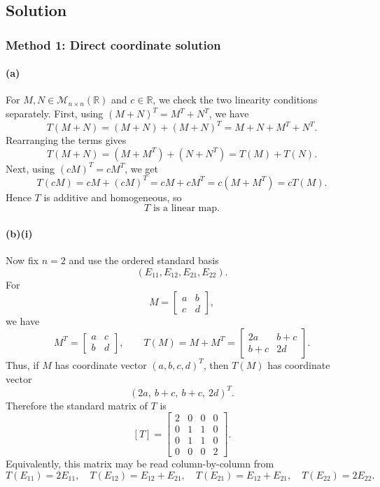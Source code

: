 \documentclass[12pt]{article}
\newcommand{\R}{\mathbb{R}}
\newcommand{\M}{\mathcal{M}}
\begin{document}
\subsection{Solution}


\subsubsection{Method 1: Direct coordinate solution}

\paragraph{(a)}
For $M,N\in \M_{n\times n}(\R)$ and $c\in\R$, we check the two linearity conditions separately.
First, using $(M+N)^T=M^T+N^T$, we have
\[
T(M+N)=(M+N)+(M+N)^T
=M+N+M^T+N^T.
\]
Rearranging the terms gives
\[
T(M+N)=(M+M^T)+(N+N^T)=T(M)+T(N).
\]
Next, using $(cM)^T=cM^T$, we get
\[
T(cM)=cM+(cM)^T=cM+cM^T=c(M+M^T)=cT(M).
\]
Hence $T$ is additive and homogeneous, so
\[
\boxed{T\text{ is a linear map}.}
\]

\paragraph{(b)(i)}
Now fix $n=2$ and use the ordered standard basis
\[
(E_{11},E_{12},E_{21},E_{22}).
\]
For
\[
M=\begin{bmatrix}a&b\\c&d\end{bmatrix},
\]
we have
\[
M^T=\begin{bmatrix}a&c\\b&d\end{bmatrix},
\qquad
T(M)=M+M^T=
\begin{bmatrix}2a&b+c\\b+c&2d\end{bmatrix}.
\]
Thus, if $M$ has coordinate vector $(a,b,c,d)^T$, then $T(M)$ has coordinate vector
\[
(2a,\ b+c,\ b+c,\ 2d)^T.
\]
Therefore the standard matrix of $T$ is
\[
\boxed{
[T]=
\begin{bmatrix}
2&0&0&0\\
0&1&1&0\\
0&1&1&0\\
0&0&0&2
\end{bmatrix}.}
\]
Equivalently, this matrix may be read column-by-column from
\[
T(E_{11})=2E_{11},\quad
T(E_{12})=E_{12}+E_{21},\quad
T(E_{21})=E_{12}+E_{21},\quad
T(E_{22})=2E_{22}.
\]
\end{document}
